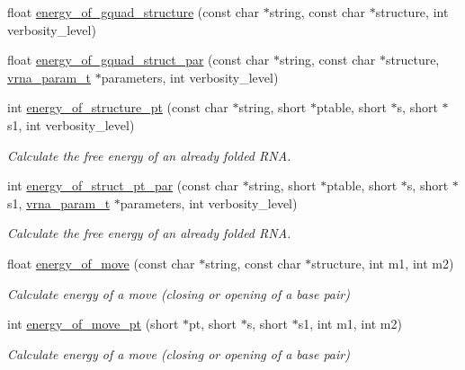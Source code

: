 \begin{DoxyCompactItemize}
float \mbox{\hyperlink{group__eval_ga30687ad32835b9894875940958e3eb9a}{energy\+\_\+of\+\_\+gquad\+\_\+structure}} (const char $\ast$string, const char $\ast$structure, int verbosity\+\_\+level)
\item 
float \mbox{\hyperlink{group__eval_ga7d8e18eab7bdc45744b063c81a25ca78}{energy\+\_\+of\+\_\+gquad\+\_\+struct\+\_\+par}} (const char $\ast$string, const char $\ast$structure, \mbox{\hyperlink{group__energy__parameters_ga8a69ca7d787e4fd6079914f5343a1f35}{vrna\+\_\+param\+\_\+t}} $\ast$parameters, int verbosity\+\_\+level)
\item 
int \mbox{\hyperlink{group__eval_ga8831445966b761417e713360791299d8}{energy\+\_\+of\+\_\+structure\+\_\+pt}} (const char $\ast$string, short $\ast$ptable, short $\ast$s, short $\ast$s1, int verbosity\+\_\+level)
\begin{DoxyCompactList}\small\item\em Calculate the free energy of an already folded R\+NA. \end{DoxyCompactList}\item 
int \mbox{\hyperlink{group__eval_ga49acb3d5627dc6823a7ce12d116d4c69}{energy\+\_\+of\+\_\+struct\+\_\+pt\+\_\+par}} (const char $\ast$string, short $\ast$ptable, short $\ast$s, short $\ast$s1, \mbox{\hyperlink{group__energy__parameters_ga8a69ca7d787e4fd6079914f5343a1f35}{vrna\+\_\+param\+\_\+t}} $\ast$parameters, int verbosity\+\_\+level)
\begin{DoxyCompactList}\small\item\em Calculate the free energy of an already folded R\+NA. \end{DoxyCompactList}\item 
float \mbox{\hyperlink{group__eval_ga539ecaed89730f7644c202f304d7529b}{energy\+\_\+of\+\_\+move}} (const char $\ast$string, const char $\ast$structure, int m1, int m2)
\begin{DoxyCompactList}\small\item\em Calculate energy of a move (closing or opening of a base pair) \end{DoxyCompactList}\item 
int \mbox{\hyperlink{group__eval_ga49e0ee561be69faf0568213546f6a53f}{energy\+\_\+of\+\_\+move\+\_\+pt}} (short $\ast$pt, short $\ast$s, short $\ast$s1, int m1, int m2)
\begin{DoxyCompactList}\small\item\em Calculate energy of a move (closing or opening of a base pair) \end{DoxyCompactList}\item 

\end{DoxyCompactItemize}
